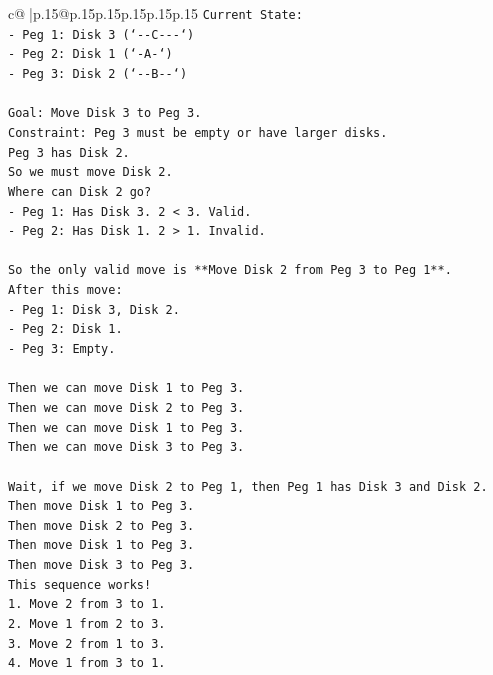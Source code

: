 \documentclass{article}
\begin{document}
{\begin{supertabular}{c@{$\;$}|p{.15\linewidth}@{}p{.15\linewidth}p{.15\linewidth}p{.15\linewidth}p{.15\linewidth}p{.15\linewidth}}
{{{\texttt{Current State:} \\
\texttt{{-} Peg 1: Disk 3 (`{-}{-}C{-}{-}{-}`)} \\
\texttt{{-} Peg 2: Disk 1 (`{-}A{-}`)} \\
\texttt{{-} Peg 3: Disk 2 (`{-}{-}B{-}{-}`)} \\
\\ 
\texttt{Goal: Move Disk 3 to Peg 3.} \\
\texttt{Constraint: Peg 3 must be empty or have larger disks.} \\
\texttt{Peg 3 has Disk 2.} \\
\texttt{So we must move Disk 2.} \\
\texttt{Where can Disk 2 go?} \\
\texttt{{-} Peg 1: Has Disk 3. 2 < 3. Valid.} \\
\texttt{{-} Peg 2: Has Disk 1. 2 > 1. Invalid.} \\
\\ 
\texttt{So the only valid move is **Move Disk 2 from Peg 3 to Peg 1**.} \\
\texttt{After this move:} \\
\texttt{{-} Peg 1: Disk 3, Disk 2.} \\
\texttt{{-} Peg 2: Disk 1.} \\
\texttt{{-} Peg 3: Empty.} \\
\\ 
\texttt{Then we can move Disk 1 to Peg 3.} \\
\texttt{Then we can move Disk 2 to Peg 3.} \\
\texttt{Then we can move Disk 1 to Peg 3.} \\
\texttt{Then we can move Disk 3 to Peg 3.} \\
\\ 
\texttt{Wait, if we move Disk 2 to Peg 1, then Peg 1 has Disk 3 and Disk 2.} \\
\texttt{Then move Disk 1 to Peg 3.} \\
\texttt{Then move Disk 2 to Peg 3.} \\
\texttt{Then move Disk 1 to Peg 3.} \\
\texttt{Then move Disk 3 to Peg 3.} \\
\texttt{This sequence works!} \\
\texttt{1. Move 2 from 3 to 1.} \\
\texttt{2. Move 1 from 2 to 3.} \\
\texttt{3. Move 2 from 1 to 3.} \\
\texttt{4. Move 1 from 3 to 1.} \\
}}}
\end{supertabular}}
\end{document}
